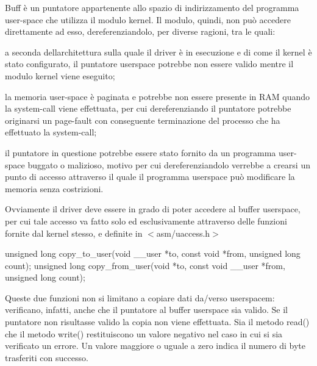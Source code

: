 Buff è un puntatore appartenente allo spazio di indirizzamento del programma user-\/space che utilizza il modulo kernel. Il modulo, quindi, non può accedere direttamente ad esso, dereferenziandolo, per diverse ragioni, tra le quali\+:
\begin{DoxyItemize}
\item a seconda dell\textquotesingle{}architettura sulla quale il driver è in esecuzione e di come il kernel è stato configurato, il puntatore userspace potrebbe non essere valido mentre il modulo kernel viene eseguito;
\item la memoria user-\/space è paginata e potrebbe non essere presente in R\+AM quando la system-\/call viene effettuata, per cui dereferenziando il puntatore potrebbe originarsi un page-\/fault con conseguente terminazione del processo che ha effettuato la system-\/call;
\item il puntatore in questione potrebbe essere stato fornito da un programma user-\/space buggato o malizioso, motivo per cui dereferenziandolo verrebbe a crearsi un punto di accesso attraverso il quale il programma userspace può modificare la memoria senza costrizioni.
\end{DoxyItemize}

Ovviamente il driver deve essere in grado di poter accedere al buffer userspace, per cui tale accesso va fatto solo ed esclusivamente attraverso delle funzioni fornite dal kernel stesso, e definite in $<$asm/uaccess.\+h$>$ 
\begin{DoxyCode}
\textcolor{keywordtype}{unsigned} \textcolor{keywordtype}{long} copy\_to\_user(\textcolor{keywordtype}{void} \_\_user *to, \textcolor{keyword}{const} \textcolor{keywordtype}{void} *from, \textcolor{keywordtype}{unsigned} \textcolor{keywordtype}{long} count);
\textcolor{keywordtype}{unsigned} \textcolor{keywordtype}{long} copy\_from\_user(\textcolor{keywordtype}{void} *to, \textcolor{keyword}{const} \textcolor{keywordtype}{void} \_\_user *from, \textcolor{keywordtype}{unsigned} \textcolor{keywordtype}{long} count);
\end{DoxyCode}
 Queste due funzioni non si limitano a copiare dati da/verso userspacem\+: verificano, infatti, anche che il puntatore al buffer userspace sia valido. Se il puntatore non risultasse valido la copia non viene effettuata. Sia il metodo read() che il metodo write() restituiscono un valore negativo nel caso in cui si sia verificato un errore. Un valore maggiore o uguale a zero indica il numero di byte trasferiti con successo.

